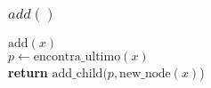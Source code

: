 \documentclass{beamer}
\begin{document}
\begin{frame}[shrink]
\frametitle{$add()$}
\begin{oframed}
\begin{flushleft}
\hspace*{1em} \ensuremath{\mathrm{add}(\ensuremath{\mathit{x}})}\\
\hspace*{1em} \hspace*{1em} \ensuremath{\ensuremath{\mathit{p}} \gets  \ensuremath{\mathrm{encontra\_ultimo}(\ensuremath{\mathit{x}})}}\\
\hspace*{1em} \hspace*{1em} {\color{black} \textbf{return}} \ensuremath{\mathrm{add\_child}(\ensuremath{\mathit{p}}, \mathrm{new\_node}(\ensuremath{\mathit{x}})})\\
\end{flushleft}
\end{oframed}

\end{frame}
\end{document}
